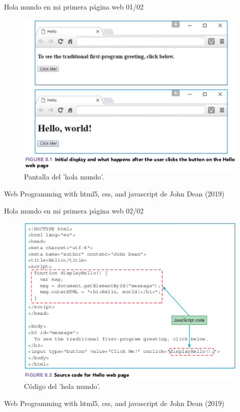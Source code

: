 \begin{frame}{Hola mundo en mi primera página web 01/02}
\justifying
\begin{figure}[H]
\centering
\includegraphics[scale=0.5]{Section_Files/images/Sec01/01.png}
\caption{Pantalla del 'hola mundo'.}
\end{figure}

{\tiny Web Programming with html5, css, and javascript de John Dean (2019)}
\end{frame}

\begin{frame}{Hola mundo en mi primera página web 02/02}
\justifying
\begin{figure}[H]
\centering
\includegraphics[scale=0.5]{Section_Files/images/Sec01/02.png}
\caption{Código del 'hola mundo'.}
\end{figure}

{\tiny Web Programming with html5, css, and javascript de John Dean (2019)}
\end{frame}

